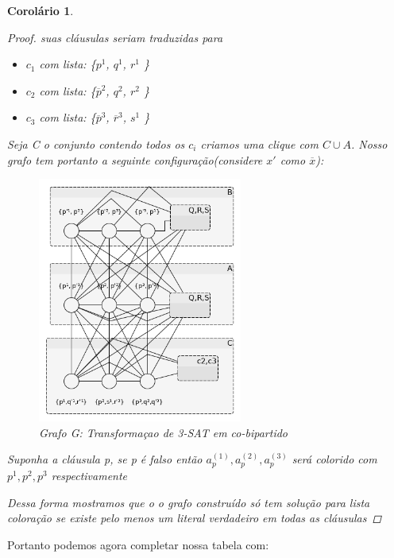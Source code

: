 \documentclass[a4paper,oneside,12pt]{book}
\newtheorem{corolario}{Corolário}
\begin{document}
\begin{corolario}
\begin{proof}
    suas cláusulas seriam traduzidas para
    \begin{itemize}
      \item $c_1$ com lista: \{$p^1$, $q^1$, $r^1$ \}
      \item $c_2$ com lista: \{$\overline{p}^2$, $q^2$, $r^2$ \}
      \item $c_3$ com lista: \{$\overline{p}^3$, $\overline{r}^3$, $s^1$ \}
    \end{itemize}
    Seja C o conjunto contendo todos os $c_i$ criamos uma clique com $C \cup A$.
    Nosso grafo tem portanto a seguinte configuração(considere $x'$ como $\overline{x}$):
    \begin{figure}[!ht]
        \centering
        \includegraphics[width=0.6\textwidth]{3-SAT.png}
        \caption{Grafo G: Transformaçao de 3-SAT em co-bipartido }
      \end{figure}
      
      Suponha a cláusula p, se p é falso então $a_p^{(1)},a_p^{(2)},a_p^{(3)}$ será colorido com $p^1,p^2,p^3$ respectivamente
      
    Dessa forma mostramos que o o grafo construído só tem solução para lista coloração se existe pelo menos um literal verdadeiro em todas as cláusulas
    \end{proof}
    \end{corolario}
    
Portanto podemos agora completar nossa tabela com:
\end{document}
